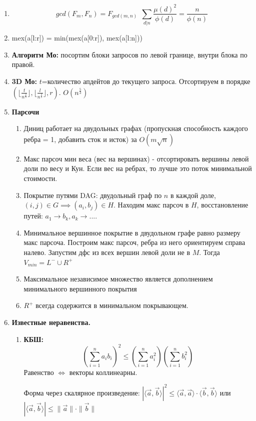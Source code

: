 \begin{enumerate}
    \item \[ gcd(F_m, F_n) = F_{gcd(m, n)} ~~ \sum_{d|n} \frac{\mu(d)^2}{\phi(d)} = \frac{n}{\phi(n)}\]
    \item mex(a[l:r]) = min(mex(a[0:r]), mex(a[l:n]))
    \item \textbf{Алгоритм Мо:} посортим блоки запросов по левой границе, внутри блока по правой.
    \item \textbf{3D Мо:} $t$=количество апдейтов до текущего запроса. Отсортируем в порядке $(\lfloor \frac{t}{n^{\frac{2}{3}}} \rfloor, \lfloor \frac{l}{n^{\frac{2}{3}}} \rfloor, r)$. $O(n^{\frac{5}{3}})$
    \item \textbf{Парсочи} \begin{enumerate}
        \item Диниц работает на двудольных графах (пропускная способность каждого ребра = 1, добавить сток и исток) за $O(m \sqrt{n})$
        \item Макс парсоч мин веса (вес на вершинах) - отсортировать вершины левой доли по весу и Кун. Если вес на ребрах, то лучше это поток минимальной стоимости.
        \item Покрытие путями DAG: двудольный граф по $n$ в каждой доле, $(i, j) \in G \implies (a_i, b_j) \in H$. Находим макс парсоч в $H$, восстановление путей: $a_1 \to b_k, a_k \to ...$.
        \item Минимальное вершинное покрытие в двудольном графе равно размеру макс парсоча. Построим макс парсоч, ребра из него ориентируем справа налево. Запустим дфс из всех вершин левой доли не в $M$. Тогда $V_{min} = L^{-} \cup R^{+}$
        \item Максимальное независимое множество является дополнением минимального вершинного покрытия
        \item $R^+$ всегда содержится в минимальном покрывающем.
    \end{enumerate}

    \item \textbf{Известные неравенства.}
    \begin{enumerate}
        \item \textbf{КБШ:}
        \[
            \left(\sum_{i=1}^{n} a_i b_i\right)^2 \leq \left(\sum_{i=1}^{n} a_i^2\right)\left(\sum_{i=1}^{n} b_i^2\right)
        \]
        Равенство $\Leftrightarrow$ векторы коллинеарны.
        
        Форма через скалярное произведение: $|\langle \vec{a}, \vec{b} \rangle|^2 \leq \langle \vec{a}, \vec{a} \rangle \cdot \langle \vec{b}, \vec{b} \rangle$ или $|\langle \vec{a}, \vec{b} \rangle| \leq \|\vec{a}\| \cdot \|\vec{b}\|$
        

\end{enumerate}
\end{enumerate}
